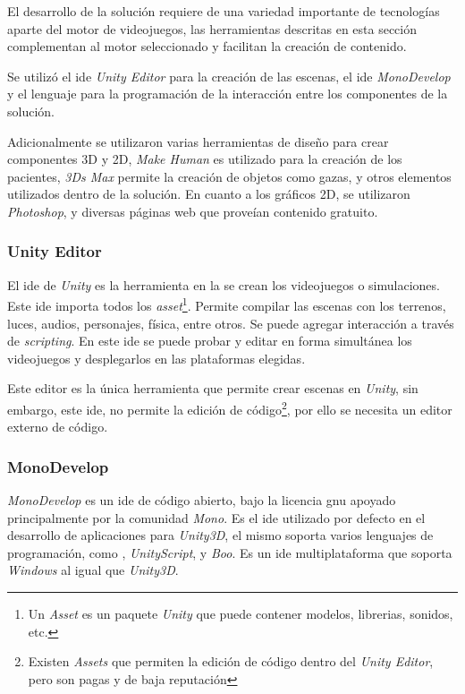El desarrollo de la solución requiere de una variedad importante de tecnologías
aparte del motor de videojuegos, las herramientas descritas en esta sección complementan al
motor seleccionado y facilitan la creación de contenido.

Se utilizó el \Gls{ide} \textit{Unity Editor} para la creación de las escenas,
el \Gls{ide} \textit{MonoDevelop} y el lenguaje \cs{} para la programación de la
interacción entre los componentes de la solución.

Adicionalmente se utilizaron varias herramientas de diseño para crear
componentes 3D y 2D, \textit{Make Human} es utilizado para la creación de los
pacientes, \textit{3Ds Max} permite la creación de objetos como gazas, y otros
elementos utilizados dentro de la solución. En cuanto a los gráficos 2D, se
utilizaron \textit{Photoshop}, y diversas páginas web que proveían contenido
gratuito.


\subsubsection{Unity Editor}

El \Gls{ide} de \textit{Unity} es la herramienta en la se crean los videojuegos
o simulaciones. Este \Gls{ide} importa todos los \textit{asset}\footnote{Un
    \textit{Asset} es un paquete \textit{Unity} que puede contener modelos,
    librerias, sonidos, etc.}. Permite compilar las escenas con los terrenos,
luces, audios, personajes, física, entre otros. Se puede agregar interacción a
través de \textit{scripting}. En este \Gls{ide} se puede probar y editar en
forma simultánea los videojuegos y desplegarlos en las plataformas
elegidas\cite{unity3d}. 

Este editor es la única herramienta que permite crear escenas en \textit{Unity},
sin embargo, este \Gls{ide}, no permite la edición de código\footnote{Existen
    \textit{Assets} que permiten la edición de código dentro del \textit{Unity
        Editor}, pero son pagas y de baja reputación}, por ello se necesita un
editor externo de código.


\subsubsection{MonoDevelop}

\textit{MonoDevelop} es un \Gls{ide} de código abierto, bajo la licencia
\Gls{gnu} apoyado principalmente por la comunidad \textit{Mono}. Es el \Gls{ide}
utilizado por defecto en el desarrollo de aplicaciones para \textit{Unity3D}, el
mismo soporta varios lenguajes de programación, como \cs{},
\textit{UnityScript}, y \textit{Boo}. Es un \Gls{ide} multiplataforma que
soporta \textit{Windows} al igual que \textit{Unity3D}.

